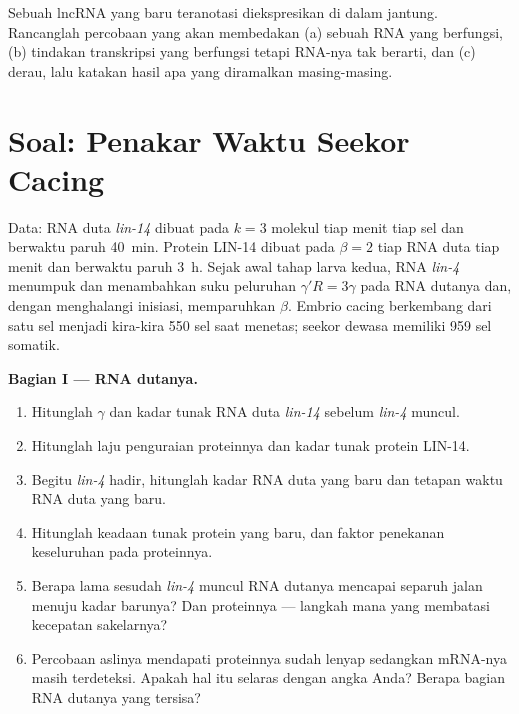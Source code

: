 \begin{exercise}[$\star\star\star$]\label{exo:b3:rna-regulation:12}
Sebuah lncRNA yang baru teranotasi diekspresikan di dalam jantung. Rancanglah
percobaan yang akan membedakan (a) sebuah RNA yang berfungsi, (b) tindakan
transkripsi yang berfungsi tetapi RNA-nya tak berarti, dan (c) derau, lalu
katakan hasil apa yang diramalkan masing-masing.
\end{exercise}

\section{Soal: Penakar Waktu Seekor Cacing}

\begin{problem}
\label{pb:b3:rna-regulation:1}
Data: RNA duta \emph{lin-14} dibuat pada $k = 3$ molekul tiap
menit tiap sel dan berwaktu paruh \qty{40}{min}. Protein LIN-14 dibuat pada
$\beta = 2$ tiap RNA duta tiap menit dan berwaktu paruh
\qty{3}{h}. Sejak awal tahap larva kedua, RNA \emph{lin-4}
menumpuk dan menambahkan suku peluruhan $\gamma' R = 3\gamma$ pada RNA
dutanya dan, dengan menghalangi inisiasi, memparuhkan $\beta$. Embrio cacing
berkembang dari satu sel menjadi kira-kira \num{550} sel saat menetas; seekor
dewasa memiliki \num{959} sel somatik.

\medskip
\noindent\textbf{Bagian I --- RNA dutanya.}
\begin{enumerate}
  \item Hitunglah $\gamma$ dan kadar tunak RNA duta \emph{lin-14}
        sebelum \emph{lin-4} muncul.
  \item Hitunglah laju penguraian proteinnya dan kadar tunak protein
        LIN-14.
  \item Begitu \emph{lin-4} hadir, hitunglah kadar RNA duta yang baru
        dan tetapan waktu RNA duta yang baru.
  \item Hitunglah keadaan tunak protein yang baru, dan faktor penekanan
        keseluruhan pada proteinnya.
  \item Berapa lama sesudah \emph{lin-4} muncul RNA dutanya mencapai
        separuh jalan menuju kadar barunya? Dan proteinnya --- langkah mana
        yang membatasi kecepatan sakelarnya?
  \item Percobaan aslinya mendapati proteinnya sudah lenyap sedangkan
        mRNA-nya masih terdeteksi. Apakah hal itu selaras dengan angka
        Anda? Berapa bagian RNA dutanya yang tersisa?
\end{enumerate}


\end{problem}
